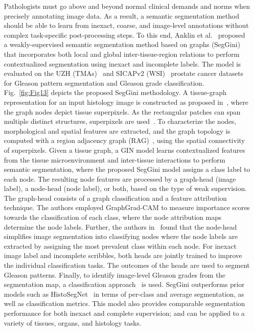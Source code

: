 Pathologists must go above and beyond normal clinical demands and norms when precisely annotating image data. As a result, a semantic segmentation method should be able to learn from inexact, coarse, and image-level annotations without complex task-specific post-processing steps.
To this end, Anklin et al.~ proposed a weakly-supervised semantic segmentation method based on graphs (SegGini) that incorporates both local and global inter-tissue-region relations to perform contextualized segmentation using inexact and incomplete labels.
The model is evaluated on the UZH (TMAs)~ and SICAPv2 (WSI)~ prostate cancer datasets for Gleason pattern segmentation and Gleason grade classification.
Fig.~\ref{fig:Fig13} depicts the proposed SegGini methodology.
A tissue-graph representation for an input histology image is constructed as proposed in~, where the graph nodes depict tissue superpixels. As the rectangular patches can span multiple distinct structures, superpixels are used~. 
To characterize the nodes, morphological and spatial features are extracted, and the graph topology is computed with a region adjacency graph (RAG)~, using the spatial connectivity of superpixels.
Given a tissue graph, a GIN model learns contextualized features from the tissue microenvironment and inter-tissue interactions to perform semantic segmentation, where the proposed SegGini model assigns a class label to each node.
The resulting node features are processed by a graph-head (image label), a node-head (node label), or both, based on the type of weak supervision.
The graph-head consists of a graph classification and a feature attribution technique. The authors employed GraphGrad-CAM to measure importance scores towards the classification of each class, where the node attribution maps determine the node labels.
Further, the authors in~ found that the node-head simplifies image segmentation into classifying nodes where the node labels are extracted by assigning the most prevalent class within each node.
For inexact image label and incomplete scribbles, both heads are jointly trained to improve the individual classification tasks. 
The outcomes of the heads are used to segment Gleason patterns.
Finally, to identify image-level Gleason grades from the segmentation map, a classification approach~ is used.
SegGini outperforms prior models such as HistoSegNet~ in terms of per-class and average segmentation, as well as classification metrics. This model also provides comparable segmentation performance for both inexact and complete supervision; and can be applied to a variety of tissues, organs, and histology tasks.
\vspace{-6pt}

